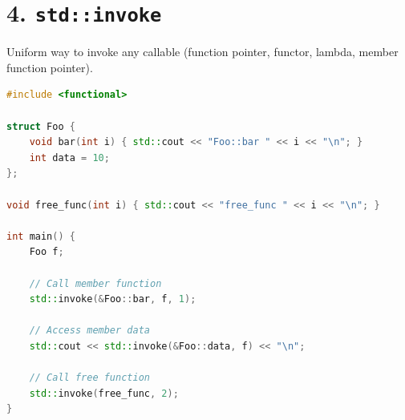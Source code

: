 \hypertarget{stdinvoke}{%
\section{\texorpdfstring{4.
\texttt{std::invoke}}{4. std::invoke}}\label{stdinvoke}}

Uniform way to invoke any callable (function pointer, functor, lambda,
member function pointer).

\begin{lstlisting}[language={C++}]
#include <functional>

struct Foo {
    void bar(int i) { std::cout << "Foo::bar " << i << "\n"; }
    int data = 10;
};

void free_func(int i) { std::cout << "free_func " << i << "\n"; }

int main() {
    Foo f;
    
    // Call member function
    std::invoke(&Foo::bar, f, 1); 
    
    // Access member data
    std::cout << std::invoke(&Foo::data, f) << "\n";
    
    // Call free function
    std::invoke(free_func, 2);
}
\end{lstlisting}
